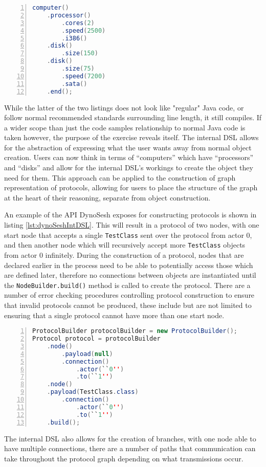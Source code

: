 \documentclass{article}
\begin{document}
\begin{lstlisting}[label={lst:intDSLJava}, language=java, frame=single, numbers=left, caption=Object construction in a method chained internal Domain Specific Language\cite{Fowler:2010:DSL:1809745}]
computer()
	.processor()
		.cores(2)
		.speed(2500)
		.i386()
	.disk()
		.size(150)
	.disk()
		.size(75)
		.speed(7200)
		.sata()
	.end();

	\end{lstlisting}
	While the latter of the two listings does not look like "regular" Java code, or follow normal recommended standards surrounding line length, it still compiles. If a wider scope than just the code samples relationship to normal Java code is taken however, the purpose of the exercise reveals itself. The internal DSL allows for the abstraction of expressing what the user wants away from normal object creation. Users can now think in terms of ``computers'' which have ``processors'' and ``disks'' and allow for the internal DSL's workings to create the object they need for them. This approach can be applied to the construction of graph representation of protocols, allowing for users to place the structure of the graph at the heart of their reasoning, separate from object construction.
	
	An example of the API DynoSesh exposes for constructing protocols is shown in listing \ref{lst:dynoSeshIntDSL}. This will result in a protocol of two nodes, with one start node that accepts a single \texttt{TestClass} sent over the protocol from actor 0, and then another node which will recursively accept more \texttt{TestClass} objects from actor 0 infinitely. During the construction of a protocol, nodes that are declared earlier in the process need to be able to potentially access those which are defined later, therefore no connections between objects are instantiated until the \texttt{NodeBuilder.build()} method is called to create the protocol. There are a number of error checking procedures controlling protocol construction to ensure that invalid protocols cannot be produced, these include but are not limited to ensuring that a single protocol cannot have more than one start node.
	\begin{lstlisting}[label={lst:dynoSeshIntDSL}, language=java, frame=single, numbers=left, caption=Construction of a DynoSesh graph using the internal DSL]
ProtocolBuilder protocolBuilder = new ProtocolBuilder();
Protocol protocol = protocolBuilder
	.node()
		.payload(null)
		.connection()
			.actor(``0'')
			.to(``1'')
	.node()
	.payload(TestClass.class)
		.connection()
			.actor(``0'')
			.to(``1'')
	.build();
	\end{lstlisting}
	The internal DSL also allows for the creation of branches, with one node able to have multiple connections, there are a number of paths that communication can take throughout the protocol graph depending on what transmissions occur.
	\pagebreak
	\printbibliography
\end{document}
